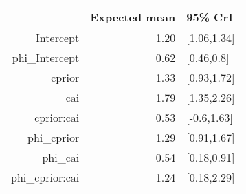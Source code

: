 \begin{tabular}{rrl}
  \hline
 & Expected mean & 95\% CrI \\ 
  \hline
Intercept & 1.20 & [1.06,1.34] \\ 
  phi\_Intercept & 0.62 & [0.46,0.8] \\ 
  cprior & 1.33 & [0.93,1.72] \\ 
  cai & 1.79 & [1.35,2.26] \\ 
  cprior:cai & 0.53 & [-0.6,1.63] \\ 
  phi\_cprior & 1.29 & [0.91,1.67] \\ 
  phi\_cai & 0.54 & [0.18,0.91] \\ 
  phi\_cprior:cai & 1.24 & [0.18,2.29] \\ 
   \hline
\end{tabular}

